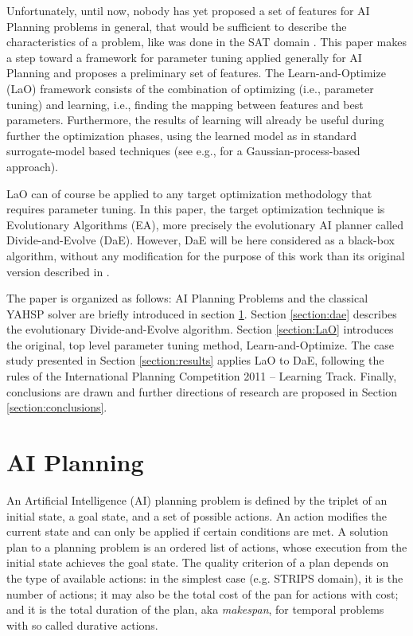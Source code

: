 \documentclass{MYsig-alternate}
\begin{document}
Unfortunately, until now, nobody has yet proposed a set of features for AI Planning problems in general, that would be sufficient to describe the characteristics of a problem, like was done in the SAT domain \cite{Hutter06}. This paper makes a step toward a framework for parameter tuning applied generally for AI Planning and proposes a preliminary set of features. The Learn-and-Optimize (LaO) framework consists of the combination of optimizing (i.e., parameter tuning) and learning, i.e., finding the mapping between features and best parameters. Furthermore, the results of learning will already be useful during further the optimization phases, using the learned model as in standard surrogate-model based techniques (see e.g., \cite{Bardenet} for a Gaussian-process-based approach).

LaO can of course be applied to any target optimization methodology that requires parameter tuning. In this paper, the target optimization technique is Evolutionary Algorithms (EA), more precisely the evolutionary AI planner called Divide-and-Evolve (DaE). However, DaE will be here considered as a black-box algorithm, without any modification for the purpose of this work than its original version described in \cite{BibEvoCop:2010}. 

The paper is organized as follows: AI Planning Problems and the classical YAHSP solver are briefly introduced in section \ref{section:planning}. Section \ref{section:dae} describes the evolutionary  Divide-and-Evolve algorithm. Section \ref{section:LaO} introduces the original, top level parameter tuning method, Learn-and-Optimize. The case study presented in Section \ref{section:results} applies LaO to DaE, following the rules of the International Planning Competition 2011 -- Learning Track. Finally, conclusions are drawn and further directions of research are proposed in Section \ref{section:conclusions}. 

\section{AI Planning}
\label{section:planning}

An Artificial Intelligence (AI) planning problem is defined by the triplet of an initial state, a goal state, and a set of possible actions. An action modifies the current state and can only be applied if certain conditions are met. A solution plan to a planning problem is an ordered list of actions, whose execution from the initial state achieves the goal state. The quality criterion of a plan depends on the type of available actions: in the simplest case (e.g. STRIPS domain), it is the number of actions; it may also be the total cost of the pan for actions with cost; and it is the total duration of the plan, aka {\em makespan}, for temporal problems with so called durative actions.
\end{document}
